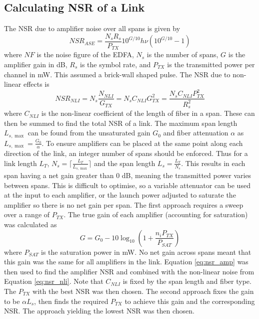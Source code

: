 \documentclass[12pt,a4paper]{article}
\begin{document}
\subsection{Calculating NSR of a Link}
The NSR due to amplifier noise over all spans is given by
\begin{equation}
    NSR_{ASE} = \frac{N_s R_s}{P_{TX}}10^{G/10}h\nu(10^{G/10}-1)
    \label{eq:nsr_amp}
\end{equation}
where \(NF\) is the noise figure of the EDFA, \(N_s\) is the number of spans, \(G\) is the amplifier gain in dB, \(R_s\) is the symbol rate, and \(P_{TX}\) is the transmitted power per channel in mW. This assumed a brick-wall shaped pulse. The NSR due to non-linear effects is
\begin{equation}
    NSR_{NLI} = N_s\frac{N_{NLI}}{G_{TX}} = N_s C_{NLI}G_{TX}^2 = \frac{N_s C_{NLI} P_{TX}^2}{R_s^2}
    \label{eq:nsr_nli}
\end{equation}
where \(C_{NLI}\) is the non-linear coefficient of the length of fiber in a span. These can then be summed to find the total NSR of a link.
The maximum span length \(L_{s,\max}\) can be found from the unsaturated gain \(G_0\) and fiber attenuation \(\alpha\) as \(L_{s,\max} = \frac{G_0}{\alpha}\). To ensure amplifiers can be placed at the same point along each direction of the link, an integer number of spans should be enforced. Thus for a link length \(L_T\), \(N_s = \lceil \frac{L_T}{L_{s,\max}} \rceil \) and the span length \(L_s = \frac{L_T}{N_s}\). This results in each span having a net gain greater than 0 dB, meaning the transmitted power varies between spans. This is difficult to optimise, so a variable attenuator can be used at the input to each amplifier, or the launch power adjusted to saturate the amplifier so there is no net gain per span. The first approach requires a sweep over a range of \(P_{TX}\). The true gain of each amplifier (accounting for saturation) was calculated as
\begin{equation}
    G = G_0 - 10\log_{10}(1 + \frac{n_i P_{TX}}{P_{SAT}})
\end{equation}
where \(P_{SAT}\) is the saturation power in mW. No net gain across spans meant that this gain was the same for all amplifiers in the link. Equation \ref{eq:nsr_amp} was then used to find the amplifier NSR and combined with the non-linear noise from Equation \ref{eq:nsr_nli}. Note that \(C_{NLI}\) is fixed by the span length and fiber type. The \(P_{TX}\) with the best NSR was then chosen. The second approach fixes the gain to be \(\alpha L_s\), then finds the required \(P_{TX}\) to achieve this gain and the corresponding NSR. The approach yielding the lowest NSR was then chosen.
\end{document}
